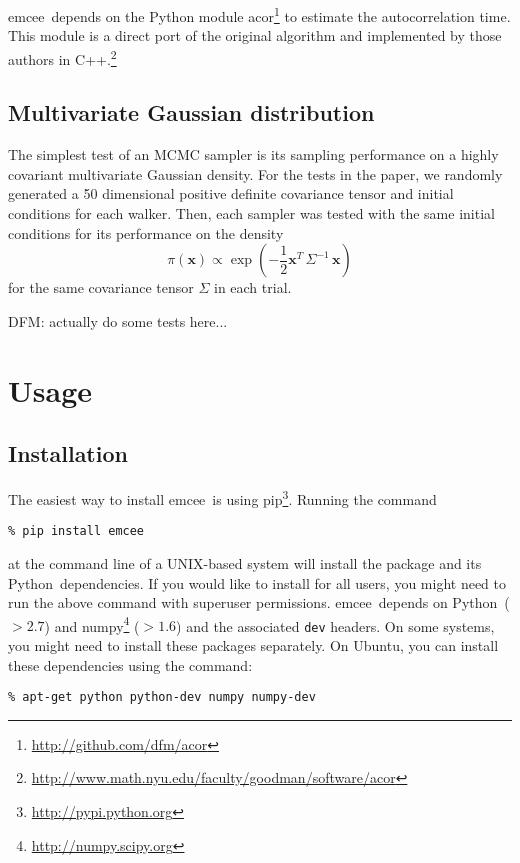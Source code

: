 \documentclass[12pt,preprint]{aastex}
\newcommand{\project}[1]{{\sffamily #1}}
\newcommand{\Python}{\project{Python}}
\newcommand{\numpy}{\project{numpy}}
\newcommand{\Ubuntu}{\project{Ubuntu}}
\newcommand{\pip}{\project{pip}}
\newcommand{\thisplain}{emcee}
\newcommand{\this}{\project{\thisplain}}
\begin{document}
\this~depends on the Python module
\project{acor}\footnote{\url{http://github.com/dfm/acor}} to estimate the
autocorrelation time. This module is a direct port of the original
algorithm \citep[described by][]{Goodman:2010} and implemented by those
authors in
C++.\footnote{\url{http://www.math.nyu.edu/faculty/goodman/software/acor}}

\subsection{Multivariate Gaussian distribution}

The simplest test of an MCMC sampler is its sampling performance on a highly
covariant multivariate Gaussian density. For the tests in the paper, we
randomly generated a 50 dimensional positive definite covariance tensor and
initial conditions for each walker. Then, each sampler was tested with the
same initial conditions for its performance on the density
\begin{equation}
    \pi (\mathbf{x}) \propto \exp\left ( -\frac{1}{2} \mathbf{x}^T \,
                                \Sigma^{-1} \, \mathbf{x} \right )
\end{equation}
for the same covariance tensor $\Sigma$ in each trial.

DFM: actually do some tests here...


\section{Usage}

\subsection{Installation}

The easiest way to install \this~is using
\pip\footnote{\url{http://pypi.python.org}}. Running the command
\begin{lstlisting}
% pip install emcee
\end{lstlisting}
at the command line of a UNIX-based system will install the package and its
\Python~dependencies. If you would like to install for all users, you might
need to run the above command with superuser permissions. \this~depends on
\Python~($>2.7$) and \numpy\footnote{\url{http://numpy.scipy.org}} ($>1.6$)
and the associated \texttt{dev} headers. On some systems, you might need to
install these packages separately. On \Ubuntu, you can install these
dependencies using the command:
\begin{lstlisting}
% apt-get python python-dev numpy numpy-dev
\end{lstlisting}
\end{document}

